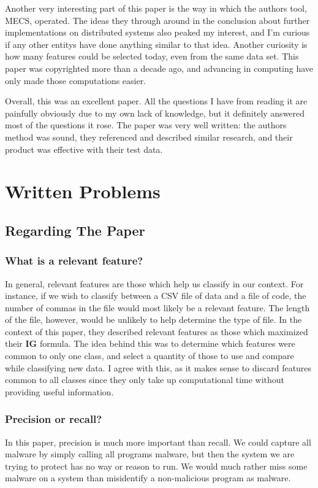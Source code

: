 \documentclass{article}
\begin{document}
Another very interesting part of this paper is the way in which the authors tool, MECS, operated. The ideas they through around in the conclusion about further implementations on distributed systems also peaked my interest, and I'm curious if any other entitys have done anything similar to that idea. Another curiosity is how many features could be selected today, even from the same data set. This paper was copyrighted more than a decade ago, and advancing in computing have only made those computations easier.

Overall, this was an excellent paper. All the questions I have from reading it are painfully obviously due to my own lack of knowledge, but it definitely answered most of the questions it rose. The paper was very well written: the authors method was sound, they referenced and described similar research, and their product was effective with their test data.

\section{Written Problems}
\subsection{Regarding The Paper}
\subsubsection{What is a relevant feature?}
In general, relevant features are those which help us classify in our context. For instance, if we wish to classify between a CSV file of data and a file of code, the number of commas in the file would most likely be a relevant feature. The length of the file, however, would be unlikely to help determine the type of file. In the context of this paper, they described relevant features as those which maximized their \textbf{IG} formula. The idea behind this was to determine which features were common to only one class, and select a quantity of those to use and compare while classifying new data. I agree with this, as it makes sense to discard features common to all classes since they only take up computational time without providing useful information.

\subsubsection{Precision or recall?}
In this paper, precision is much more important than recall. We could capture all malware by simply calling all programs malware, but then the system we are trying to protect has no way or reason to run. We would much rather miss some malware on a system than misidentify a non-malicious program as malware. 
\end{document}
